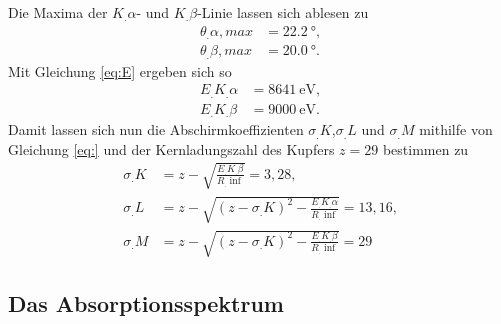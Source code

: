 Die Maxima der $K_.{\alpha}$- und $K_.{\beta}$-Linie lassen sich ablesen zu
\begin{align*}
\theta_.{\alpha,max}&=\SI{22,2}{\degree}\text{,}\\
\theta_.{\beta,max}&=\SI{20,0}{\degree}\text{.}
\end{align*}
Mit Gleichung \ref{eq:E} ergeben sich so
\begin{align*}
E_.{K_.{\alpha}}&=\SI{8641}{\eV}\text{,}\\
E_.{K_.{\beta}}&=\SI{9000}{\eV}\text{.}
\end{align*}
Damit lassen sich nun die Abschirmkoeffizienten $\sigma_.K$,$\sigma_.L$ und $\sigma_.M$ mithilfe von Gleichung \ref{eq:} und der Kernladungszahl des Kupfers $z=29$ bestimmen zu
\begin{align*}
\sigma_.K&=z-\sqrt{\frac{E_.{K_.{\beta}}}{R_.{\inf}}}=3,28\text{,}\\
\sigma_.L&=z-\sqrt{\left(z-\sigma_.K\right)^2-\frac{E_.{K_.{\alpha}}}{R_.{\inf}}}=13,16\text{,}\\
\sigma_.M&=z-\sqrt{\left(z-\sigma_.K\right)^2-\frac{E_.{K_.{\beta}}}{R_.{\inf}}}=29
\end{align*}

\subsection{Das Absorptionsspektrum}

